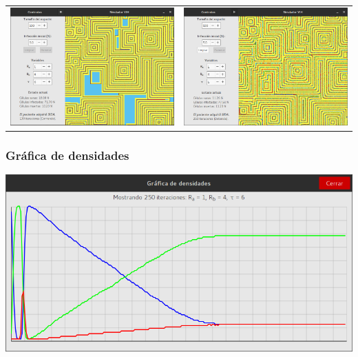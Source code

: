 \documentclass[12pt,letterpaper,oneside]{report}
\begin{document}
	\begin{center}
		\begin{tabular}{c c}
		\includegraphics[width=8cm]{img/tiempo/prueba/alta/3.png} & \includegraphics[width=8cm]{img/tiempo/prueba/alta/4.png} \\
		\end{tabular}
	\end{center}

	\subsubsection{Gráfica de densidades}
	\begin{center}
		\includegraphics[width=14cm]{img/tiempo/prueba/alta/g.png}
	\end{center}
\end{document}

